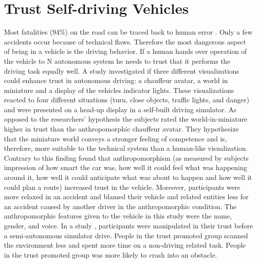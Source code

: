\section{Trust Self-driving Vehicles}\label{sec:trust}
Most fatalities (94\%) on the road can be traced back to human error \cite{Singh2015CriticalSurvey}. Only a few accidents occur because of technical flaws. Therefore the most dangerous aspect of being in a vehicle is the driving behavior. If a human hands over operation of the vehicle to N autonomous system he needs to trust that it performs the driving task equally well. A study \cite{Hauslschmid2017}
investigated if three different visualizations could enhance trust in autonomous driving: a chauffeur avatar, a world in miniature and a display of the vehicles indicator lights. These visualizations reacted to four different situations (turn, close objects, traffic lights, and danger) and were presented on a head-up display in a self-built driving simulator. As opposed to the researchers' hypothesis the subjects rated the world-in-miniature higher in trust than the anthropomorphic chauffeur avatar. They hypothesize that the miniature world conveys a
stronger feeling of competence and is, therefore, more suitable to the technical system than a human-like visualization.
Contrary to this finding \cite{Waytz2014} found that anthropomorphism (as measured by subjects impression of how smart the car was, how well it could feel what was happening around it, how well it could anticipate what was about to happen and how well it could plan a route) increased trust in the vehicle. Moreover, participants were more relaxed in an accident and blamed their vehicle and related entities less for an accident caused by another driver in the anthropomorphic condition. The anthropomorphic features given to the vehicle in this study were the name, gender, and voice. 
In a study \cite{Korber2018}, participants were manipulated in their trust before a semi-autonomous simulator drive. People in the trust promoted group scanned the environment less and spent more time on a non-driving related task. People in the trust promoted group was more likely to crash into an obstacle. 
